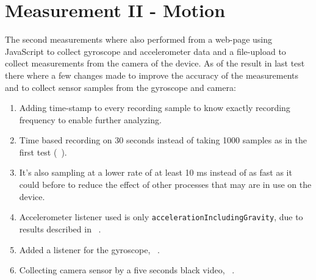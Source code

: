 \section{Measurement II - Motion}\label{sec:measurementII}
The second measurements where also performed from a web-page using JavaScript to collect gyroscope and accelerometer data and a file-upload to collect measurements from the camera of the device. As of the result in last test there where a few changes made to improve the accuracy of the measurements and to collect sensor samples from the gyroscope and camera:
\begin{enumerate}
  \item Adding time-stamp to every recording sample to know exactly recording frequency to enable further analyzing.
  \item Time based recording on 30 seconds instead of taking 1000 samples as in the first test (~).
  \item It's also sampling at a lower rate of at least 10 ms instead of as fast as it could before to reduce the effect of other processes that may are in use on the device.
  \item Accelerometer listener used is only \texttt{accelerationIncludingGravity}, due to results described in ~.
  \item Added a listener for the gyroscope, ~.
  \item Collecting camera sensor by a five seconds black video, ~.
\end{enumerate}

